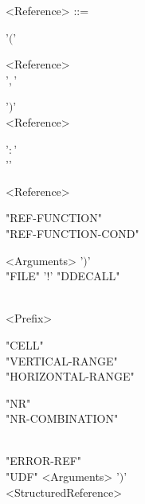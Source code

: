 \begin{grammar}
		<Reference> ::= \begin{syntdiag}[\footnotesize\sdlengths]
		\begin{stack} '$($' \begin{rep} <Reference> \\  '$,$' \end{rep} '$)$' \\
		<Reference> \begin{stack} '$:$' \\ '' \end{stack} <Reference> \\
		\begin{stack} "REF-FUNCTION" \\ "REF-FUNCTION-COND" \end{stack} <Arguments> '$)$' \\
		"FILE" '$!$' "DDECALL" \\
		\begin{stack} \\
		<Prefix>
		\end{stack}
		\begin{stack}
			"CELL" \\
			"VERTICAL-RANGE" \\
			"HORIZONTAL-RANGE" \\
			\begin{stack} "NR" \\ "NR-COMBINATION" \end{stack} \\
			"ERROR-REF" \\
			"UDF" <Arguments> '$)$' \\
			<StructuredReference>
		\end{stack}
		\end{stack}
		\end{syntdiag}
	\end{grammar}